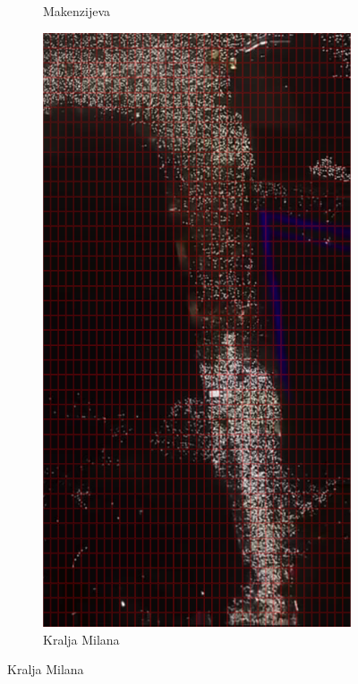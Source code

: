 \documentclass[a4paper,12pt]{article}
\begin{document}
\begin{figure}[H]
\begin{subfigure}[b]{0.3\textwidth}
	  \caption{Makenzijeva}
	  \label{fig:makenzijeva}
	\end{subfigure}
	\hfill
	\begin{subfigure}[b]{0.3\textwidth}
	  \centering
	  \includegraphics[width=\textwidth]{../outputs/grid_output/kralja-milana_grid.png}
	  \caption{Kralja Milana}
	  \label{fig:kralja-milana}

\end{subfigure}
\end{figure}
\end{document}
